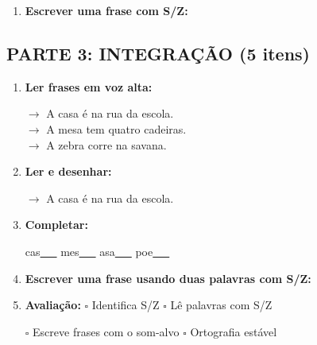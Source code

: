 \begin{exercicio}
\begin{enumerate}[resume]
  \item \textbf{Escrever uma frase com S/Z:}
  \begin{center}
  \underline{\hspace{12cm}}
  \end{center}

\end{enumerate}

\subsection*{PARTE 3: INTEGRAÇÃO (5 itens)}

\begin{enumerate}[resume]

  \item \textbf{Ler frases em voz alta:}
  \begin{center}
  $\rightarrow$ A casa é na rua da escola.\\
  $\rightarrow$ A mesa tem quatro cadeiras.\\
  $\rightarrow$ A zebra corre na savana.\\
  \end{center}

  \item \textbf{Ler e desenhar:}
  \begin{center}
  $\rightarrow$ A casa é na rua da escola.
  \end{center}
  \begin{center}
  \end{center}

  \item \textbf{Completar:}
  \begin{center}
  cas\underline{~~~} \quad mes\underline{~~~} \quad asa\underline{~~~} \quad poe\underline{~~~}
  \end{center}

  \item \textbf{Escrever uma frase usando duas palavras com S/Z:}
  \begin{center}
  \underline{\hspace{12cm}}
  \end{center}

  \item \textbf{Avaliação:} $\square$ Identifica S/Z \quad $\square$ Lê palavras com S/Z
  \begin{center}
  $\square$ Escreve frases com o som-alvo \quad $\square$ Ortografia estável
  \end{center}


\end{enumerate}
\end{exercicio}
